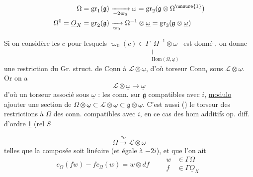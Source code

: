 \[ \begin{aligned}
 \Omega=\mathrm{gr}_1(\mathfrak g)&\xrightarrow[-2\varpi_0]{}\omega=\mathrm{gr}_2(\mathfrak g\otimes\Omega^{\unsure{1}})\\
 \Omega^0=\underline O_X=\mathrm{gr}_2(\mathfrak g)&\xrightarrow[\varpi_0]{}\Omega^{-1}\otimes\underline\omega=\mathrm{gr}_3(\mathfrak g\otimes\underline\omega)
 \end{aligned} \]

Si on considère les $c$ pour lesquels $\varpi_0(c)\in\Gamma\underset{\substack{\Vert\\\mathrm{Hom}(\Omega,\underline\omega)}}{\Omega^{-1}\otimes\underline\omega}$ est donné , on donne une restriction du Gr. struct. de $\underline{\mathrm{Conn}}$ à $\mathscr L\otimes\underline\omega$, d'où torseur $\mathrm{Conn}_i$ sous $\mathscr L\otimes\underline\omega$. Or on a
\[ \mathscr L\otimes\underline\omega\longrightarrow\underline\omega \]
d'où un torseur associé sous $\underline\omega$ : les conn. sur $\mathfrak g$ compatibles avec $i$, \uline{modulo} ajouter une section de $\Omega\otimes\underline\omega\subset\mathscr L\otimes\underline\omega\subset\mathfrak g\otimes\underline\omega$. C'est aussi () le torseur des restrictions à $\Omega$ des conn. compatibles avec $i$, en ce cas des hom additifs op. diff. d'ordre \uline{1} (rel $S$

\[ \Omega\xrightarrow{c_\Omega}\mathscr L\otimes\omega \]
telles que la composée \deleted{$\unsure{\Omega\to\Omega\otimes\omega}$}  soit linéaire (et égale à $-2i$), et que l'on ait
\[ c_\Omega(fw)-fc_\Omega(w)=w\otimes df\qquad \begin{aligned}w&\in\Gamma\Omega\\f&\in\Gamma\underline O_X\end{aligned} \]


